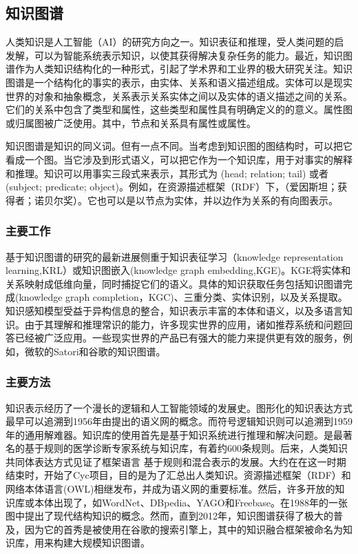 \documentclass[UTF8,a4paper]{ctexart}
\begin{document}
\subsection{知识图谱}
人类知识是人工智能（AI）的研究方向之一。知识表征和推理，受人类问题的启发解，可以为智能系统表示知识，以使其获得解决复杂任务\cite{newell1959report}的能力。最近，知识图谱作为人类知识结构化的一种形式，引起了学术界和工业界\cite{dong2014knowledge}的极大研究关注。知识图谱是一个结构化的事实的表示，由实体、关系和语义描述组成。实体可以是现实世界的对象和抽象概念，关系表示关系实体之间以及实体的语义描述之间的关系。它们的关系中包含了类型和属性，这些类型和属性具有明确定义的的意义。属性图或归属图被广泛使用。其中，节点和关系具有属性或属性。
\par 
知识图谱是知识的同义词。但有一点不同。当考虑到知识图的图结构时，可以把它看成一个图\cite{bordes2011learning}。当它涉及到形式语义，可以把它作为一个知识库，用于对事实的解释和推理。知识可以用事实三段式来表示，其形式为 (head; relation; tail) 或者 (subject; predicate; object)。例如，在资源描述框架（RDF）下，（爱因斯坦；获得者；诺贝尔奖）。它也可以是以节点为实体，并以边作为关系的有向图表示。
\subsubsection{主要工作}
基于知识图谱的研究的最新进展侧重于知识表征学习（knowledge representation learning,KRL）或知识图嵌入(knowledge graph embedding,KGE)。KGE将实体和关系映射成低维向量\cite{wang2017knowledge}，同时捕捉它们的语义。具体的知识获取任务包括知识图谱完成(knowledge graph completion，KGC)、三重分类、实体识别，以及关系提取。知识感知模型受益于异构信息的整合，知识表示丰富的本体和语义，以及多语言知识。由于其理解和推理常识的能力，许多现实世界的应用，诸如推荐系统和问题回答已经被广泛应用。一些现实世界的产品已有强大的能力来提供更有效的服务，例如，微软的Satori和谷歌的知识图谱\cite{dong2014knowledge}。
\subsubsection{主要方法}
知识表示经历了一个漫长的逻辑和人工智能领域的发展史。图形化的知识表达方式最早可以追溯到1956年由\citeauthor{richens1956preprogramming}提出的语义网的概念。而符号逻辑知识则可以追溯到1959年的通用解难器\cite{newell1959report}。知识库的使用首先是基于知识系统进行推理和解决问题。\cite[MYCIN]{shortliffe2012computer}是最著名的基于规则的医学诊断专家系统与知识库，有着约600条规则。后来，人类知识共同体表达方式见证了框架语言
基于规则和混合表示的发展。大约在在这一时期结束时，开始了Cyc项目，目的是为了汇总出人类知识。资源描述框架（RDF）和网络本体语言(OWL)相继发布，并成为语义网的重要标准。然后，许多开放的知识库或本体出现了，如WordNet、DBpedia、YAGO和Freebase。\citeauthor{stokman1988structuring}在1988年的一张图中提出了现代结构知识的概念。然而，直到2012年，知识图谱获得了极大的普及，因为它的首秀是被使用在谷歌的搜索引擎上，其中的知识融合框架被命名为知识库\cite{dong2014knowledge}，用来构建大规模知识图谱。
\end{document}
